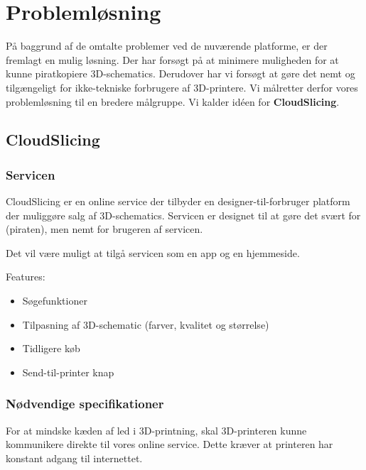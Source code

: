 \chapter{Problemløsning} %
\label{cha:probleml_sning}


På baggrund af de omtalte problemer ved de nuværende platforme, er der fremlagt en mulig løsning. Der har forsøgt på at minimere muligheden for at kunne piratkopiere 3D-schematics. Derudover har vi forsøgt at gøre det nemt og tilgængeligt for ikke-tekniske forbrugere af 3D-printere. Vi målretter derfor vores problemløsning til en bredere målgruppe. Vi kalder idéen for \textbf{CloudSlicing}. 

\section{CloudSlicing} %
\label{sec:cloudslicing}

\subsection{Servicen} %
\label{ssub:servicen}

CloudSlicing er en online service der tilbyder en designer-til-forbruger platform der muliggøre salg af 3D-schematics. Servicen er designet til at gøre det svært for (piraten), men nemt for brugeren af servicen.

Det vil være muligt at tilgå servicen som en app og en hjemmeside.

Features:
\begin{itemize}
	\item Søgefunktioner
	\item Tilpasning af 3D-schematic (farver, kvalitet og størrelse)
	\item Tidligere køb
	\item Send-til-printer knap
\end{itemize}




\subsection{Nødvendige specifikationer} %
\label{sub:krav_til_3d_teknologien}

For at mindske kæden af led i 3D-printning, skal 3D-printeren kunne kommunikere direkte til vores online service. Dette kræver at printeren har konstant adgang til internettet.

